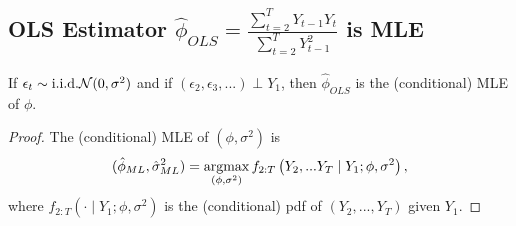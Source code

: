 \documentclass[11pt]{elegantbook}
\newcommand{\argmax}{\operatornamewithlimits{argmax}}
\begin{document}
\subsection{OLS Estimator $\hat{\phi}_{OLS}=\frac{\sum_{t=2}^TY_{t-1}Y_t}{\sum_{t=2}^T Y_{t-1}^2}$ is MLE}
\begin{claim}
    If $\epsilon_t\sim \textnormal{i.i.d.} \mathcal{N}(0,\sigma^2)$ and if $(\epsilon_2,\epsilon_3,...)\perp Y_1$, then $\hat{\phi}_{OLS}$ is the (conditional) MLE of $\phi$.
\end{claim}
\begin{proof}
    The (conditional) MLE of $(\phi,\sigma^2)$ is
    \begin{equation}
        \begin{aligned}
            (\hat{\phi}_{ML},\hat{\sigma}^2_{ML})=\argmax_{(\phi,\sigma^2)} f_{2:T}\left(Y_2,...Y_T\mid Y_1;\phi,\sigma^2\right),
        \end{aligned}
        \nonumber
    \end{equation}
    where $f_{2:T}(\cdot\mid Y_1; \phi,\sigma^2)$ is the (conditional) pdf of $(Y_2,...,Y_T)$ given $Y_1$.
    

\end{proof}
\end{document}
